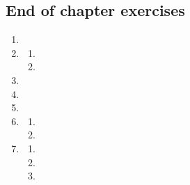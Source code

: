 \subsection{End of chapter exercises} %
    \begin{enumerate}[label=\textbf{\arabic*}.]
	\item %

	\item %
	\begin{enumerate}[noitemsep, label=\textbf{(\alph*)} ]
	    \item %
	    \item %
	\end{enumerate}

	\item %

	\item %

	\item %

	\item %
	\begin{enumerate}[noitemsep, label=\textbf{(\alph*)} ]
	    \item %

	    \item %
	\end{enumerate}

	\item %
	\begin{enumerate}[noitemsep, label=\textbf{(\alph*)} ]
	    \item %
	    \item %
	    \item %
	\end{enumerate}


\end{enumerate}
